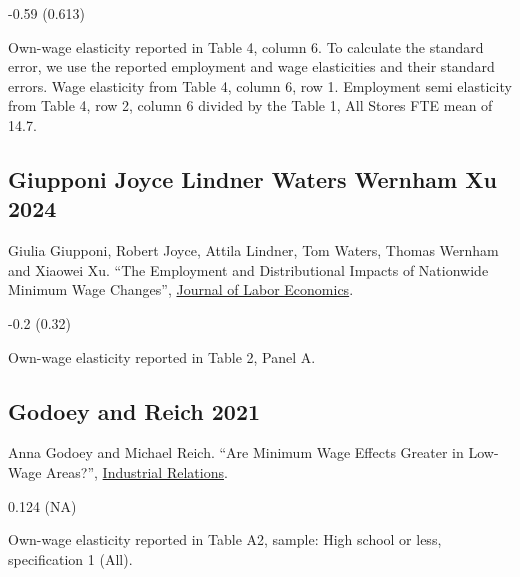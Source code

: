 \vspace{0.7em}

 -0.59 (0.613)

\vspace{0.7em}

 Own-wage elasticity reported in Table 4, column 6. To calculate the standard error, we use the reported employment and wage elasticities and their standard errors. Wage elasticity from Table 4, column 6, row 1. Employment semi elasticity from Table 4, row 2, column 6 divided by the Table 1, All Stores FTE mean of 14.7.

\subsection*{Giupponi Joyce Lindner Waters Wernham Xu 2024}
\vspace{-0.7em}

\noindent Giulia Giupponi, Robert Joyce, Attila Lindner, Tom Waters, Thomas Wernham and Xiaowei Xu. ``The Employment and Distributional Impacts of Nationwide Minimum Wage Changes'', \href{https://doi.org/10.1086/728471}{Journal of Labor Economics}.

\vspace{0.7em}

 -0.2 (0.32)

\vspace{0.7em}

 Own-wage elasticity reported in Table 2, Panel A.

\subsection*{Godoey and Reich 2021}
\vspace{-0.7em}

\noindent Anna Godoey and Michael Reich. ``Are Minimum Wage Effects Greater in Low-Wage Areas?'', \href{https://doi.org/10.1111/irel.12267}{Industrial Relations}.

\vspace{0.7em}

 0.124 (NA)

\vspace{0.7em}

 Own-wage elasticity reported in Table A2, sample: High school or less, specification 1 (All).

